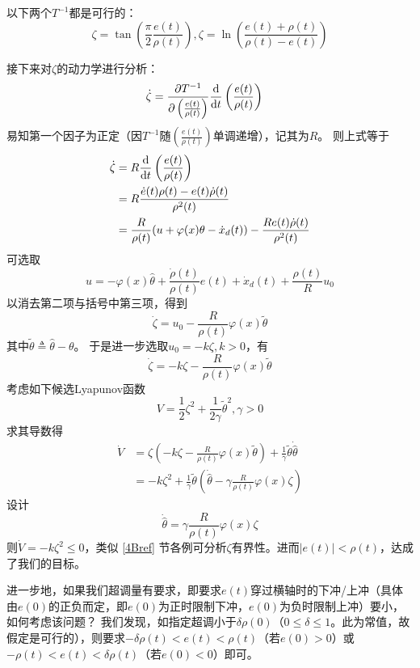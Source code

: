\begin{example}
    以下两个$T^{-1}$都是可行的：
    \[\zeta = \tan\left(\frac{\pi}{2}\frac{e(t)}{\rho(t)}\right),\zeta = \ln\left(\frac{e(t)+\rho(t)}{\rho(t)-e(t)}\right)\]
\end{example}

接下来对$\zeta$的动力学进行分析：
\begin{align*}
    \dot{\zeta} &= \frac{\partial T^{-1}}{\partial \left(\frac{e(t)}{\rho(t)}\right)}
    \frac{\mathop{}\!\mathrm{d}}{\mathop{}\!\mathrm{d} t}\left(\frac{e(t)}{\rho(t)}\right)
\end{align*}
易知第一个因子为正定（因$T^{-1}$随$\left(\frac{e(t)}{\rho(t)}\right)$单调递增），记其为$R$。
则上式等于
\begin{align*}
    \dot{\zeta} &= R
    \frac{\mathop{}\!\mathrm{d}}{\mathop{}\!\mathrm{d} t}\left(\frac{e(t)}{\rho(t)}\right)\\
    &=R\frac{\dot{e}(t)\rho(t)-e(t)\dot{\rho}(t)}{\rho^2(t)}\\
    &=\frac{R}{\rho(t)}(u+\varphi(x)\theta-\dot{x}_d(t))-\frac{Re(t)\dot{\rho}(t)}{\rho^2(t)}
\end{align*}
可选取\[u=-\varphi(x)\hat{\theta}+\frac{\dot{\rho}(t)}{\rho(t)}e(t)+\dot{x}_d(t)+\frac{\rho(t)}{R}u_0\]
以消去第二项与括号中第三项，得到
\[\dot{\zeta} = u_0-\frac{R}{\rho(t)}\varphi(x)\tilde{\theta}\]
其中$\tilde{\theta}\triangleq \hat{\theta}-\theta$。
于是进一步选取$u_0=-k\zeta,k>0$，有
\[\dot{\zeta} = -k\zeta-\frac{R}{\rho(t)}\varphi(x)\tilde{\theta}\]
考虑如下候选Lyapunov函数
\[V=\frac{1}{2}\zeta^2+\frac{1}{2\gamma}\tilde{\theta}^2,\gamma>0\]
求其导数得\begin{align*}
    \dot{V}&=\zeta\left(-k\zeta-\frac{R}{\rho(t)}\varphi(x)\tilde{\theta}\right)+\frac{1}{\gamma}\tilde{\theta}\dot{\hat{\theta}}\\
    &=-k\zeta^2+\frac{1}{\gamma}\tilde{\theta}\left(\dot{\hat{\theta}}-\gamma \frac{R}{\rho(t)}\varphi(x)\zeta\right)
\end{align*}
设计\[\dot{\hat{\theta}}=\gamma \frac{R}{\rho(t)}\varphi(x)\zeta\]
则$\dot{V}=-k\zeta^2\le 0$，类似 \ref{4Bref} 节各例可分析$\zeta$有界性。进而$|e(t)|<\rho(t)$，达成了我们的目标。

进一步地，如果我们超调量有要求，即要求$e(t)$穿过横轴时的下冲/上冲（具体由$e(0)$的正负而定，即$e(0)$为正时限制下冲，$e(0)$为负时限制上冲）要小，如何考虑该问题？
我们发现，如指定超调小于$\delta\rho(0)$（$0\le\delta\le 1$。此为常值，故假定是可行的），则要求$-\delta\rho(t)<e(t)<\rho(t)$（若$e(0)>0$）或$-\rho(t)<e(t)<\delta\rho(t)$（若$e(0)<0$）即可。


